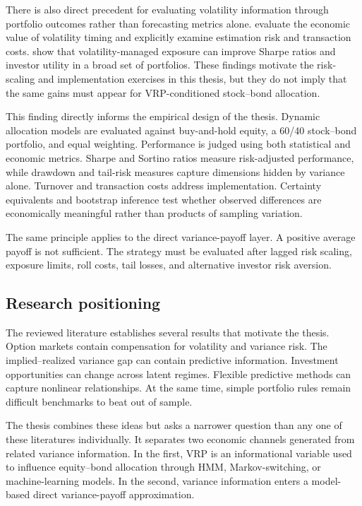 There is also direct precedent for evaluating volatility information through portfolio outcomes rather than forecasting metrics alone. \textcite{FlemingKirbyOstdiek2001} evaluate the economic value of volatility timing and explicitly examine estimation risk and transaction costs. \textcite{MoreiraMuir2017} show that volatility-managed exposure can improve Sharpe ratios and investor utility in a broad set of portfolios. These findings motivate the risk-scaling and implementation exercises in this thesis, but they do not imply that the same gains must appear for VRP-conditioned stock--bond allocation.

This finding directly informs the empirical design of the thesis. Dynamic allocation models are evaluated against buy-and-hold equity, a 60/40 stock--bond portfolio, and equal weighting. Performance is judged using both statistical and economic metrics. Sharpe and Sortino ratios measure risk-adjusted performance, while drawdown and tail-risk measures capture dimensions hidden by variance alone. Turnover and transaction costs address implementation. Certainty equivalents and bootstrap inference test whether observed differences are economically meaningful rather than products of sampling variation.

The same principle applies to the direct variance-payoff layer. A positive average payoff is not sufficient. The strategy must be evaluated after lagged risk scaling, exposure limits, roll costs, tail losses, and alternative investor risk aversion.

\subsection{Research positioning}

The reviewed literature establishes several results that motivate the thesis. Option markets contain compensation for volatility and variance risk. The implied--realized variance gap can contain predictive information. Investment opportunities can change across latent regimes. Flexible predictive methods can capture nonlinear relationships. At the same time, simple portfolio rules remain difficult benchmarks to beat out of sample.

The thesis combines these ideas but asks a narrower question than any one of these literatures individually. It separates two economic channels generated from related variance information. In the first, VRP is an informational variable used to influence equity--bond allocation through HMM, Markov-switching, or machine-learning models. In the second, variance information enters a model-based direct variance-payoff approximation.

